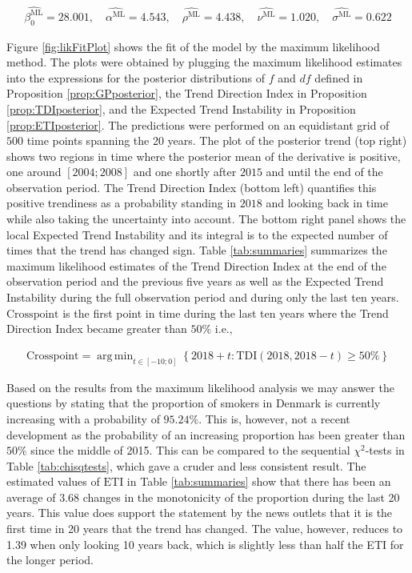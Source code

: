 \documentclass[11pt,]{article}
\DeclareMathOperator*{\argmin}{arg\,min}
\theoremstyle{nonumberplain}
\begin{document}
\begin{align}
  \widehat{\beta_0^\text{ML}} = 28.001, \quad \widehat{\alpha^\text{ML}} = 4.543, \quad \widehat{\rho^\text{ML}} = 4.438, \quad \widehat{\nu^\text{ML}} = 1.020, \quad \widehat{\sigma^\text{ML}} = 0.622\label{eq:mlEstimates}
\end{align}

Figure \ref{fig:likFitPlot} shows the fit of the model by the maximum
likelihood method. The plots were obtained by plugging the maximum
likelihood estimates into the expressions for the posterior
distributions of \(f\) and \(df\) defined in Proposition
\ref{prop:GPposterior}, the Trend Direction Index in Proposition
\ref{prop:TDIposterior}, and the Expected Trend Instability in
Proposition \ref{prop:ETIposterior}. The predictions were performed on
an equidistant grid of \(500\) time points spanning the 20 years. The
plot of the posterior trend (top right) shows two regions in time where
the posterior mean of the derivative is positive, one around
\([2004; 2008]\) and one shortly after \(2015\) and until the end of the
observation period. The Trend Direction Index (bottom left) quantifies
this positive trendiness as a probability standing in \(2018\) and
looking back in time while also taking the uncertainty into account. The
bottom right panel shows the local Expected Trend Instability and its
integral is to the expected number of times that the trend has changed
sign. Table \ref{tab:summaries} summarizes the maximum likelihood
estimates of the Trend Direction Index at the end of the observation
period and the previous five years as well as the Expected Trend
Instability during the full observation period and during only the last
ten years. \(\text{Crosspoint}\) is the first point in time during the
last ten years where the Trend Direction Index became greater than
\(50\%\) i.e.,

\begin{align*}
\text{Crosspoint} = \argmin_{t \in [-10; 0]} \left\{2018 + t : \text{TDI}(2018, 2018 - t) \geq 50\%\right\}
\end{align*}

Based on the results from the maximum likelihood analysis we may answer
the questions by stating that the proportion of smokers in Denmark is
currently increasing with a probability of \(95.24\%\). This is,
however, not a recent development as the probability of an increasing
proportion has been greater than \(50\%\) since the middle of 2015. This
can be compared to the sequential \(\chi^2\)-tests in Table
\ref{tab:chisqtests}, which gave a cruder and less consistent result.
The estimated values of \(\mathrm{ETI}\) in Table \ref{tab:summaries}
show that there has been an average of \(3.68\) changes in the
monotonicity of the proportion during the last 20 years. This value does
support the statement by the news outlets that it is the first time in
20 years that the trend has changed. The value, however, reduces to 1.39
when only looking 10 years back, which is slightly less than half the
ETI for the longer period.
\end{document}
